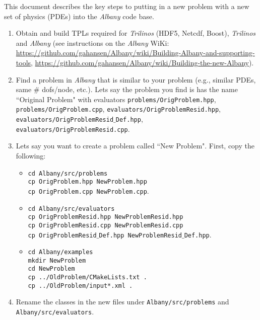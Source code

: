 \documentclass[11pt]{article}
\begin{document}
\maketitle

This document describes the key steps to putting in a new problem with a new set of physics (PDEs) into 
the \textit{Albany} code base. 

\begin{enumerate}
\item Obtain and build TPLs required for \textit{Trilinos} (HDF5, Netcdf, Boost), \textit{Trilinos} and \textit{Albany} (see instructions 
on the \textit{Albany} WiKi: \url{https://github.com/gahansen/Albany/wiki/Building-Albany-and-supporting-tools}, \url{https://github.com/gahansen/Albany/wiki/Building-the-new-Albany}).
\item Find a problem in \textit{Albany} that is similar to your problem (e.g., similar PDEs, same \# dofs/node, etc.). Lets say the problem you find is has the name ``Original Problem" with evaluators {\tt problems/OrigProblem.hpp}, {\tt problems/OrigProblem.cpp}, {\tt evaluators/OrigProblemResid.hpp}, {\tt evaluators/OrigProblemResid}$\_${\tt Def.hpp}, {\tt evaluators/OrigProblemResid.cpp}.   
\item Lets say you want to create a problem called ``New Problem".  First, copy the following: 
\begin{itemize}
\item {\tt cd Albany/src/problems} \\
 {\tt cp OrigProblem.hpp NewProblem.hpp}\\
 {\tt cp OrigProblem.cpp NewProblem.cpp}.
\item {\tt cd Albany/src/evaluators}\\ 
 {\tt cp OrigProblemResid.hpp NewProblemResid.hpp}\\
 {\tt cp OrigProblemResid.cpp NewProblemResid.cpp}\\
 {\tt cp OrigProblemResid}$\_${\tt Def.hpp NewProblemResid}$\_${\tt Def.hpp}. 
\item {\tt cd Albany/examples} \\ 
{\tt mkdir NewProblem}\\
{\tt cd NewProblem}\\
{\tt cp ../OldProblem/CMakeLists.txt .}\\
{\tt cp ../OldProblem/input*.xml .}  
\end{itemize} 
\item Rename the classes in the new files under {\tt Albany/src/problems} and {\tt Albany/src/evaluators}. 

\end{enumerate}
\end{document}
